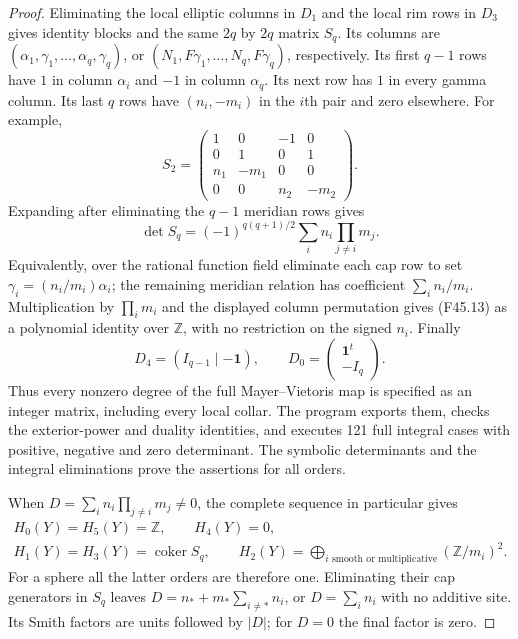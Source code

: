 \begin{proof}
Eliminating the local elliptic columns in $D_1$ and the local
rim rows in $D_3$ gives identity blocks and the same $2q$ by
$2q$ matrix $S_q$. Its columns are
$(\alpha_1,\gamma_1,\ldots,\alpha_q,\gamma_q)$, or
$(N_1,F\gamma_1,\ldots,N_q,F\gamma_q)$, respectively.
Its first $q-1$ rows have $1$ in column $\alpha_i$ and $-1$
in column $\alpha_q$. Its next row has $1$ in every gamma
column. Its last $q$ rows have $(n_i,-m_i)$ in the $i$th
pair and zero elsewhere. For example,
\[
 S_2=\begin{pmatrix}
 1&0&-1&0\\0&1&0&1\\n_1&-m_1&0&0\\0&0&n_2&-m_2
 \end{pmatrix}.                                    \tag{F45.12}
\]
Expanding after eliminating the $q-1$ meridian rows gives
\[
 \det S_q=(-1)^{q(q+1)/2}
       \sum_i n_i\prod_{j\ne i}m_j.                 \tag{F45.13}
\]
Equivalently, over the rational function field eliminate each
cap row to set $\gamma_i=(n_i/m_i)\alpha_i$; the remaining
meridian relation has coefficient $\sum_i n_i/m_i$.
Multiplication by $\prod_i m_i$ and the displayed column
permutation gives (F45.13) as a polynomial identity over
$\mathbb Z$, with no restriction on the signed $n_i$.
Finally
\[
 D_4=(I_{q-1}\mid-\mathbf1),\qquad
 D_0=\begin{pmatrix}\mathbf1^t\\-I_q\end{pmatrix}. \tag{F45.14}
\]
Thus every nonzero degree of the full Mayer--Vietoris map is
specified as an integer matrix, including every local collar.
The program 
exports them, checks the exterior-power and duality identities,
and executes 121 full integral cases with positive, negative and
zero determinant. The symbolic determinants and the integral
eliminations prove the assertions for all orders.

When $D=\sum_i n_i\prod_{j\ne i}m_j\ne0$, the complete
sequence in particular gives
\[
 \begin{gathered}
 H_0(Y)=H_5(Y)=\mathbb Z,\qquad H_4(Y)=0,\\
 H_1(Y)=H_3(Y)=\operatorname{coker}S_q,\qquad
 H_2(Y)=\bigoplus_{i\text{ smooth or multiplicative}}
                                  (\mathbb Z/m_i)^2.
 \end{gathered}                                    \tag{F45.15}
\]
For a sphere all the latter orders are therefore one. Eliminating
their cap generators in $S_q$ leaves $D=n_*+m_*\sum_{i\ne *}n_i$,
or $D=\sum_i n_i$ with no additive site. Its Smith factors are
units followed by $|D|$; for $D=0$ the final factor is zero.


\end{proof}
